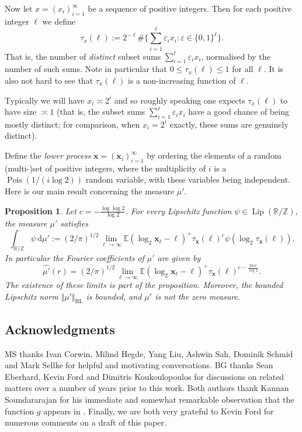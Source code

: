 \documentclass[11pt,reqno]{amsart}
\numberwithin{equation}{section}
\newtheorem{proposition}[theorem]{Proposition}
\theoremstyle{definition}
\theoremstyle{remark}
\newcommand{\mb}{\mathbb}
\newcommand{\mbf}{\mathbf}
\newcommand{\wh}{\widehat}
\newcommand{\eps}{\varepsilon}
\newcommand\Pois{\operatorname{Pois}}
\def\BL{\operatorname{BL}}
\renewcommand{\le}{\leqslant}
\newcommand\Z{\mathbb{Z}}
\newcommand\R{\mathbb{R}}
\newcommand\Lip{\operatorname{Lip}}
\begin{document}
Now let $x = (x_i)_{i = 1}^{\infty}$ be a sequence of positive integers. Then for each positive integer $\ell$ we define
\begin{equation}\label{tau-stat-def} \tau_{x}(\ell) := 2^{-\ell} \# \{ \sum_{i = 1}^{\ell} \eps_i x_i : \eps \in \{0,1\}^{\ell}\}.\end{equation} That is, the number of \emph{distinct} subset sums $\sum_{i = 1}^{\ell} \eps_i x_i$, normalised by the number of such sums. Note in particular that $0 \le \tau_{x}(\ell) \le 1$ for all $\ell$. It is also not hard to see that $\tau_{x}(\ell)$ is a non-increasing function of $\ell$. 

Typically we will have $x_i \asymp 2^i$ and so roughly speaking one expects $\tau_{x}(\ell)$ to have size $\asymp 1$ (that is, the subset sums $\sum_{i = 1}^{\ell} \eps_i x_i$ have a good chance of being mostly distinct; for comparison, when $x_i = 2^i$ exactly, these sums are genuinely distinct).

Define the \emph{lower process} $\mbf{x} = (\mbf{x}_i)_{i = 1}^{\infty}$ by ordering the elements of a random (multi-)set of positive integers, where the multiplicity of $i$ is a $\Pois(1/(i\log 2))$ random variable, with these variables being independent. Here is our main result concerning the measure $\mu'$.

\begin{proposition}\label{sec17-main}
Let $c = -\frac{\log \log 2}{\log 2}$. For every Lipschitz function $\psi \in \Lip(\R/\Z)$, the measure $\mu'$ satisfies
\[ \int_{\R/\Z} \psi \, \mathrm{d}\mu' := (2/\pi)^{1/2}\lim_{\ell \rightarrow \infty}\mb{E} (\log_2 \mbf{x}_{\ell} - \ell)^+ \tau_{\mbf{x}} (\ell)^c \psi(\log_2 \tau_{\mbf{x}}(\ell)).\] In particular the Fourier coefficients of $\mu'$ are given by
\[  \wh{\mu'}(r) =  (2/\pi)^{1/2}\lim_{\ell \rightarrow \infty}\mb{E} (\log_2 \mbf{x}_{\ell} - \ell)^+ \tau_{\mbf{x}}(\ell)^{c - \frac{2\pi i r}{\log 2}}.\] The existence of these limits is part of the proposition. Moreover, the bounded Lipschitz norm $\Vert \mu' \Vert_{\BL}$ is bounded, and $\mu'$ is not the zero measure.
\end{proposition}

\subsection{Acknowledgments}
MS thanks Ivan Corwin, Milind Hegde, Yang Liu, Ashwin Sah, Dominik Schmid and Mark Sellke for helpful and motivating conversations. BG thanks Sean Eberhard, Kevin Ford and Dimitris Koukoulopoulos for discussions on related matters over a number of years prior to this work.
Both authors thank Kannan Soundararajan for his immediate and somewhat remarkable observation that the function $g$ appears in \cite{granville-sedunova-sabuncu}. Finally, we are both very grateful to Kevin Ford for numerous comments on a draft of this paper.
\end{document}
